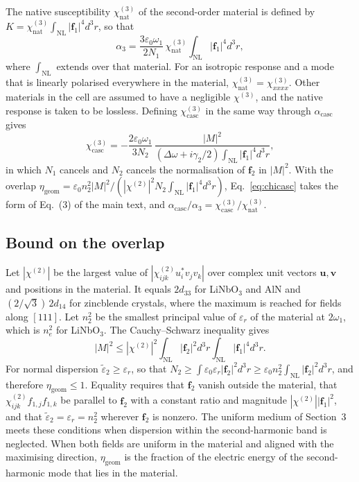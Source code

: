 \documentclass[9pt]{osa-supplemental-document}
\newcommand{\chitwo}{\chi^{(2)}}
\newcommand{\chithree}{\chi^{(3)}}
\newcommand{\chicasc}{\chi^{(3)}_{\mathrm{casc}}}
\newcommand{\chinat}{\chi^{(3)}_{\mathrm{nat}}}
\newcommand{\Dom}{\Delta\omega}
\newcommand{\etag}{\eta_{\mathrm{geom}}}
\newcommand{\f}{\mathbf f}
\newcommand{\acasc}{\alpha_{\mathrm{casc}}}
\newcommand{\NL}{\mathrm{NL}}
\begin{document}
The native susceptibility $\chinat$ of the second-order material is
defined by $K=\chinat\int_{\NL}|\f_1|^4d^3r$, so that
\begin{equation}
  \alpha_3=\frac{3\varepsilon_0\omega_1}{2N_1}\,\chinat\int_{\NL}|\f_1|^4d^3r ,
\end{equation}
where $\int_{\NL}$ extends over that material.  For an isotropic response
and a mode that is linearly polarised everywhere in the material,
$\chinat=\chithree_{xxxx}$.  Other materials in the cell are assumed to
have a negligible $\chithree$, and the native response is taken to be
lossless.  Defining $\chicasc$ in the same way through $\acasc$ gives
\begin{equation}
  \chicasc=-\frac{2\varepsilon_0\omega_1}{3N_2}\,
  \frac{|M|^2}{(\Dom+i\gamma_2/2)\int_{\NL}|\f_1|^4d^3r},
  \label{eq:chicasc}
\end{equation}
in which $N_1$ cancels and $N_2$ cancels the normalisation of $\f_2$ in
$|M|^2$.  With the overlap
$\etag=\varepsilon_0n_2^2|M|^2/(|\chitwo|^2N_2\int_{\NL}|\f_1|^4d^3r)$,
Eq.~\eqref{eq:chicasc} takes the form of Eq.~(3) of the main text, and
$\acasc/\alpha_3=\chicasc/\chinat$.

\subsection{Bound on the overlap}

Let $|\chitwo|$ be the largest value of $|\chitwo_{ijk}u^*_iv_jv_k|$ over
complex unit vectors $\mathbf u,\mathbf v$ and positions in the material.
It equals $2d_{33}$ for LiNbO$_3$ and AlN and $(2/\sqrt3)\,2d_{14}$ for
zincblende crystals, where the maximum is reached for fields along
$[111]$.  Let $n_2^2$ be the smallest principal value of $\varepsilon_r$ of
the material at $2\omega_1$, which is $n_e^2$ for LiNbO$_3$.  The
Cauchy--Schwarz inequality gives
\begin{equation}
  |M|^2\le|\chitwo|^2\int_{\NL}|\f_2|^2d^3r\int_{\NL}|\f_1|^4d^3r .
\end{equation}
For normal dispersion $\tilde\varepsilon_2\ge\varepsilon_r$, so that
$N_2\ge\int\varepsilon_0\varepsilon_r|\f_2|^2d^3r\ge\varepsilon_0n_2^2\int_{\NL}|\f_2|^2d^3r$,
and therefore $\etag\le1$.  Equality requires that $\f_2$ vanish outside
the material, that $\chitwo_{ijk}f_{1,j}f_{1,k}$ be parallel to $\f_2$ with
a constant ratio and magnitude $|\chitwo||\f_1|^2$, and that
$\tilde\varepsilon_2=\varepsilon_r=n_2^2$ wherever $\f_2$ is nonzero.  The
uniform medium of Section~3 meets these conditions when dispersion within
the second-harmonic band is neglected.  When both fields are uniform in
the material and aligned with the maximising direction, $\etag$ is the
fraction of the electric energy of the second-harmonic mode that lies in
the material.
\end{document}
